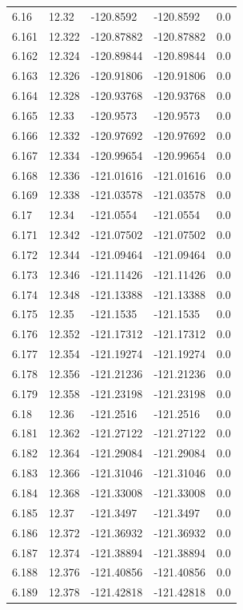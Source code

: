 \begin{tabular}{lllll}
6.16 & 12.32 & -120.8592 & -120.8592 & 0.0 \\
6.161 & 12.322 & -120.87882 & -120.87882 & 0.0 \\
6.162 & 12.324 & -120.89844 & -120.89844 & 0.0 \\
6.163 & 12.326 & -120.91806 & -120.91806 & 0.0 \\
6.164 & 12.328 & -120.93768 & -120.93768 & 0.0 \\
6.165 & 12.33 & -120.9573 & -120.9573 & 0.0 \\
6.166 & 12.332 & -120.97692 & -120.97692 & 0.0 \\
6.167 & 12.334 & -120.99654 & -120.99654 & 0.0 \\
6.168 & 12.336 & -121.01616 & -121.01616 & 0.0 \\
6.169 & 12.338 & -121.03578 & -121.03578 & 0.0 \\
6.17 & 12.34 & -121.0554 & -121.0554 & 0.0 \\
6.171 & 12.342 & -121.07502 & -121.07502 & 0.0 \\
6.172 & 12.344 & -121.09464 & -121.09464 & 0.0 \\
6.173 & 12.346 & -121.11426 & -121.11426 & 0.0 \\
6.174 & 12.348 & -121.13388 & -121.13388 & 0.0 \\
6.175 & 12.35 & -121.1535 & -121.1535 & 0.0 \\
6.176 & 12.352 & -121.17312 & -121.17312 & 0.0 \\
6.177 & 12.354 & -121.19274 & -121.19274 & 0.0 \\
6.178 & 12.356 & -121.21236 & -121.21236 & 0.0 \\
6.179 & 12.358 & -121.23198 & -121.23198 & 0.0 \\
6.18 & 12.36 & -121.2516 & -121.2516 & 0.0 \\
6.181 & 12.362 & -121.27122 & -121.27122 & 0.0 \\
6.182 & 12.364 & -121.29084 & -121.29084 & 0.0 \\
6.183 & 12.366 & -121.31046 & -121.31046 & 0.0 \\
6.184 & 12.368 & -121.33008 & -121.33008 & 0.0 \\
6.185 & 12.37 & -121.3497 & -121.3497 & 0.0 \\
6.186 & 12.372 & -121.36932 & -121.36932 & 0.0 \\
6.187 & 12.374 & -121.38894 & -121.38894 & 0.0 \\
6.188 & 12.376 & -121.40856 & -121.40856 & 0.0 \\
6.189 & 12.378 & -121.42818 & -121.42818 & 0.0 \\

\end{tabular}
